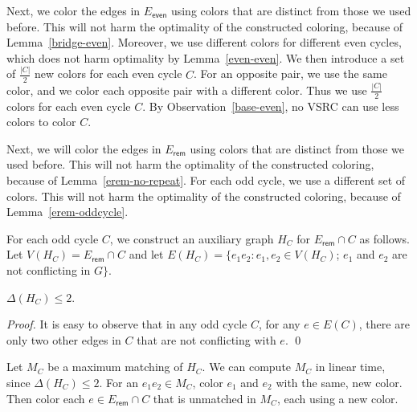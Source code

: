 \documentclass[letter,runningheads,envcountsame,envcountsect]{llncs}
\newcommand{\eeven}{E_{\mathsf{even}}}
\newcommand{\erem}{E_{\mathsf{rem}}}
\begin{document}
Next, we color the edges in $\eeven$ using colors that are distinct from those we used before. This will not harm the optimality of the constructed coloring, because of Lemma~\ref{bridge-even}. Moreover, we use different colors for different even cycles, which does not harm optimality by Lemma~\ref{even-even}. We then introduce a set of $\frac{|C|}{2}$ new colors for each even cycle $C$. For an opposite pair, we use the same color, and we color each opposite pair with a different color. Thus we use $\frac{|C|}{2}$ colors for each even cycle $C$. By Observation~\ref{base-even}, no VSRC can use less colors to color $C$.

Next, we will color the edges in $\erem$ using colors that are distinct from those we used before. This will not harm the optimality of the constructed coloring, because of Lemma~\ref{erem-no-repeat}. For each odd cycle, we use a different set of colors. This will not harm the optimality of the constructed coloring, because of Lemma~\ref{erem-oddcycle}.

For each odd cycle $C$, we construct an auxiliary graph $H_C$ for $\erem\cap C$ as follows. Let $V(H_C)=\erem\cap C$ and let $E(H_C)=\{ e_1e_2 : e_1,e_2\in V(H_C)$; $e_1$ and $e_2$ are not conflicting in $G \}$.

\begin{lemma}\label{conflict-bip}
$\Delta(H_C)\le 2$.
\end{lemma}
\begin{proof}
It is easy to observe that in any odd cycle $C$, for any $e\in E(C)$, there are only two other edges in $C$ that are not conflicting with $e$.
\qed\end{proof}

Let $M_C$ be a maximum matching of $H_C$. We can compute $M_C$ in linear time, since $\Delta(H_C) \leq 2$. For an $e_1e_2\in M_C$, color $e_1$ and $e_2$ with the same, new color.
Then color each $e\in \erem\cap C$ that is unmatched in $M_C$, each using a new color.
\end{document}
